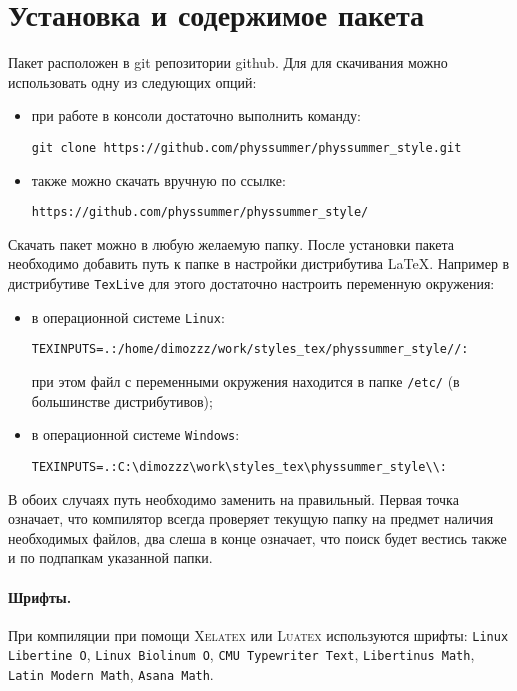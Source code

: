 \section{Установка и содержимое пакета}

Пакет расположен в git репозитории github. Для для скачивания можно использовать одну из следующих
опций:
\begin{itemize}
    \item при работе в консоли достаточно выполнить команду:
        \begin{lstlisting}[gobble = 7, keepspaces = \false]
            git clone https://github.com/physsummer/physsummer_style.git
        \end{lstlisting}
    \item также можно скачать вручную по ссылке:
        \begin{lstlisting}[gobble = 7, keepspaces = \false]
            https://github.com/physsummer/physsummer_style/
        \end{lstlisting}
\end{itemize}


Скачать пакет можно в любую желаемую папку. После установки пакета необходимо добавить путь к папке в
настройки дистрибутива \LaTeX. Например в дистрибутиве \texttt{TexLive} для этого достаточно настроить
переменную окружения:

\begin{itemize}
    \item в операционной системе \texttt{Linux}:
        \begin{lstlisting}[gobble = 7, keepspaces = \false]
            TEXINPUTS=.:/home/dimozzz/work/styles_tex/physsummer_style//:
        \end{lstlisting}
        при этом файл с переменными окружения находится в папке \texttt{/etc/} (в большинстве дистрибутивов);
    \item в операционной системе \texttt{Windows}:
        \begin{lstlisting}[gobble = 7, keepspaces = \false]
            TEXINPUTS=.:C:\dimozzz\work\styles_tex\physsummer_style\\:
        \end{lstlisting}
\end{itemize}

В обоих случаях путь необходимо заменить на правильный. Первая точка означает, что компилятор всегда
проверяет текущую папку на предмет наличия необходимых файлов, два слеша в конце означает, что поиск
будет вестись также и по подпапкам указанной папки.

\paragraph{Шрифты.} При компиляции при помощи \textsc{Xelatex} или \textsc{Luatex} используются шрифты:
\texttt{Linux Libertine O}, \texttt{Linux Biolinum O}, \texttt{CMU Typewriter Text},
\texttt{Libertinus Math}, \texttt{Latin Modern Math}, \texttt{Asana Math}.
